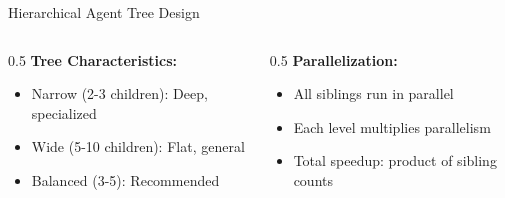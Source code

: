\documentclass[aspectratio=169,11pt]{beamer}
\begin{document}
\begin{frame}{Hierarchical Agent Tree Design}
    \vspace{0.2cm}
    \begin{columns}[T]
        \begin{column}{0.5\textwidth}
            \textbf{Tree Characteristics:}
            \begin{itemize}
                \item Narrow (2-3 children): Deep, specialized
                \item Wide (5-10 children): Flat, general
                \item Balanced (3-5): Recommended
            \end{itemize}
        \end{column}
        \begin{column}{0.5\textwidth}
            \textbf{Parallelization:}
            \begin{itemize}
                \item All siblings run in parallel
                \item Each level multiplies parallelism
                \item Total speedup: product of sibling counts
            \end{itemize}
        \end{column}
    \end{columns}
\end{frame}
\end{document}
